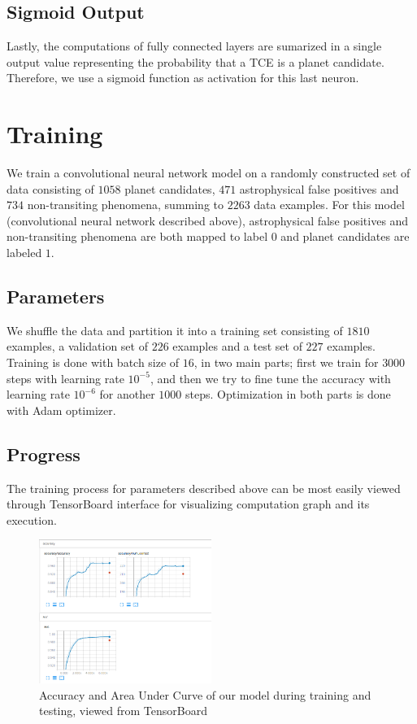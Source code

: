 \documentclass[twoside]{article}
\begin{document}
\begin{multicols}{2}
\subsection{Sigmoid Output}
Lastly, the computations of fully connected layers are sumarized in a single output value representing the probability that a TCE is a planet candidate. Therefore, we use a sigmoid function as activation for this last neuron.


\section{Training}
We train a convolutional neural network model on a randomly constructed set of data consisting of $1058$ planet candidates, $471$ astrophysical false positives and $734$ non-transiting phenomena, summing to $2263$ data examples. For this model (convolutional neural network described above), astrophysical false positives and non-transiting phenomena are both mapped to label $0$ and planet candidates are labeled $1$. 

\subsection{Parameters}
We shuffle the data and partition it into a training set consisting of $1810$ examples, a validation set of $226$ examples and a test set of $227$ examples. Training is done with batch size of $16$, in two main parts; first we train for $3000$ steps with learning rate $10^{-5}$, and then we try to fine tune the accuracy with learning rate $10^{-6}$ for another $1000$ steps. Optimization in both parts is done with Adam optimizer.

\subsection{Progress}
The training process for parameters described above can be most easily viewed through TensorBoard interface for visualizing computation graph and its execution. 
\begin{figure}[H]
\includegraphics[width=0.5\textwidth]{train-test_acc}
\caption{Accuracy and Area Under Curve of our model during training and testing, viewed from TensorBoard}
\label{fig:accuracy}
\end{figure}


\end{multicols}
\end{document}
